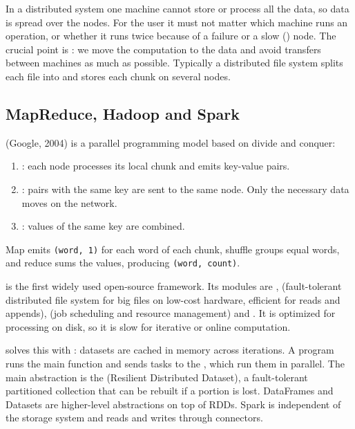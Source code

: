 In a distributed system one machine cannot store or process all the data, so data is spread over the nodes. For the user it must not matter which machine runs an operation, or whether it runs twice because of a failure or a slow () node. The crucial point is : we move the computation to the data and avoid transfers between machines as much as possible. Typically a distributed file system splits each file into  and stores each chunk on several nodes.

\subsection{MapReduce, Hadoop and Spark}
 (Google, 2004) is a parallel programming model based on divide and conquer:
\begin{enumerate}
  \item {}: each node processes its local chunk and emits key-value pairs.
  \item {}: pairs with the same key are sent to the same node. Only the necessary data moves on the network.
  \item {}: values of the same key are combined.
\end{enumerate}

\begin{example}[WordCount]
Map emits \texttt{(word, 1)} for each word of each chunk, shuffle groups equal words, and reduce sums the values, producing \texttt{(word, count)}.
\end{example}

 is the first widely used open-source framework. Its modules are ,  (fault-tolerant distributed file system for big files on low-cost hardware, efficient for reads and appends),  (job scheduling and resource management) and . It is optimized for  processing on disk, so it is slow for iterative or online computation.

 solves this with : datasets are cached in memory across iterations. A  program runs the main function and sends tasks to the , which run them in parallel. The main abstraction is the  (Resilient Distributed Dataset), a fault-tolerant partitioned collection that can be rebuilt if a portion is lost. DataFrames and Datasets are higher-level abstractions on top of RDDs. Spark is independent of the storage system and reads and writes through connectors.

